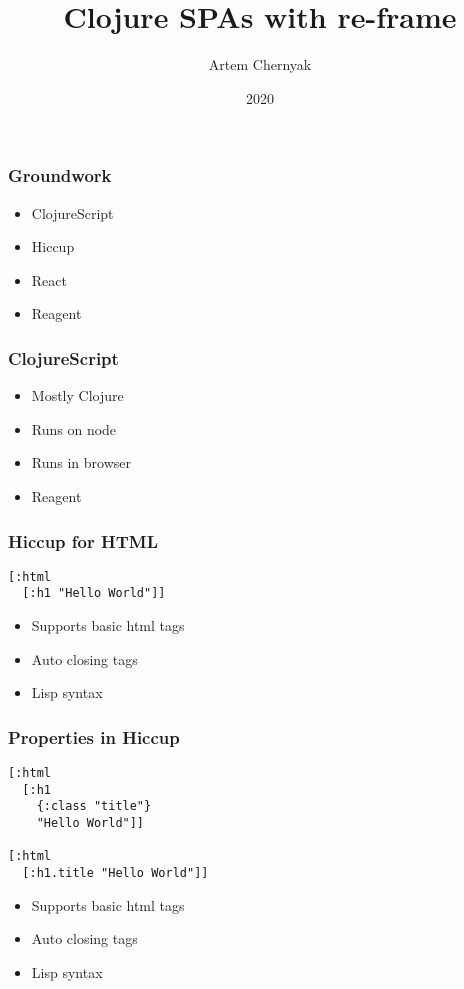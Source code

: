\documentclass{beamer}
\title{Clojure SPAs with re-frame}
\author{Artem Chernyak}
\date{2020}
\begin{document}
  \frame{\titlepage}

  \begin{frame}
    \frametitle{Groundwork}
    \begin{itemize}
      \item ClojureScript
      \item Hiccup
      \item React
      \item Reagent
    \end{itemize}
  \end{frame}

  \begin{frame}
    \frametitle{ClojureScript}
    \begin{itemize}
      \item Mostly Clojure
      \item Runs on node
      \item Runs in browser
      \item Reagent
    \end{itemize}
  \end{frame}

  \begin{frame}[fragile]
    \frametitle{Hiccup for HTML}
    \begin{verbatim}
[:html
  [:h1 "Hello World"]]
    \end{verbatim}
    \begin{itemize}
      \item Supports basic html tags
      \item Auto closing tags
      \item Lisp syntax
    \end{itemize}
  \end{frame}

  \begin{frame}[fragile]
    \frametitle{Properties in Hiccup}
    \begin{verbatim}
[:html
  [:h1
    {:class "title"}
    "Hello World"]]

[:html
  [:h1.title "Hello World"]]
    \end{verbatim}
    \begin{itemize}
      \item Supports basic html tags
      \item Auto closing tags
      \item Lisp syntax
    \end{itemize}
  \end{frame}
\end{document}
